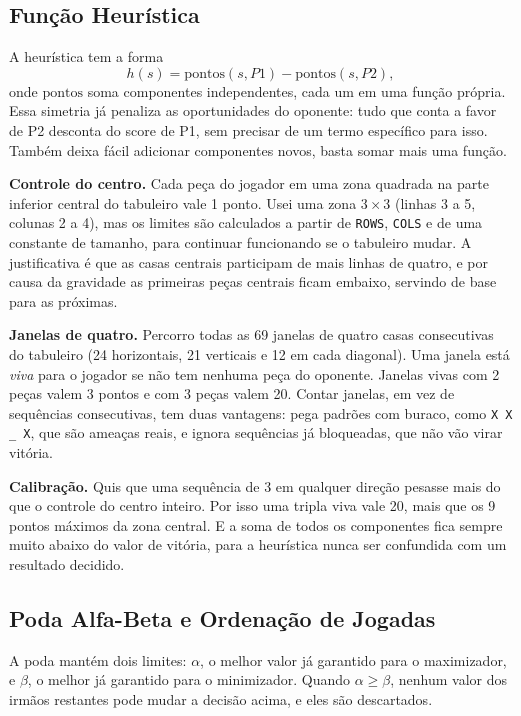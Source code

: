 \documentclass[letterpaper]{article} %
\begin{document}
\subsection{Função Heurística}
A heurística tem a forma
\[
h(s) = \mathrm{pontos}(s, P1) - \mathrm{pontos}(s, P2),
\]
onde $\mathrm{pontos}$ soma componentes independentes, cada um em uma função própria. Essa simetria já penaliza as oportunidades do oponente: tudo que conta a favor de P2 desconta do score de P1, sem precisar de um termo específico para isso. Também deixa fácil adicionar componentes novos, basta somar mais uma função.

\textbf{Controle do centro.} Cada peça do jogador em uma zona quadrada na parte inferior central do tabuleiro vale 1 ponto. Usei uma zona $3 \times 3$ (linhas 3 a 5, colunas 2 a 4), mas os limites são calculados a partir de \texttt{ROWS}, \texttt{COLS} e de uma constante de tamanho, para continuar funcionando se o tabuleiro mudar. A justificativa é que as casas centrais participam de mais linhas de quatro, e por causa da gravidade as primeiras peças centrais ficam embaixo, servindo de base para as próximas.

\textbf{Janelas de quatro.} Percorro todas as 69 janelas de quatro casas consecutivas do tabuleiro (24 horizontais, 21 verticais e 12 em cada diagonal). Uma janela está \emph{viva} para o jogador se não tem nenhuma peça do oponente. Janelas vivas com 2 peças valem 3 pontos e com 3 peças valem 20. Contar janelas, em vez de sequências consecutivas, tem duas vantagens: pega padrões com buraco, como \texttt{X X \_ X}, que são ameaças reais, e ignora sequências já bloqueadas, que não vão virar vitória.

\textbf{Calibração.} Quis que uma sequência de 3 em qualquer direção pesasse mais do que o controle do centro inteiro. Por isso uma tripla viva vale 20, mais que os 9 pontos máximos da zona central. E a soma de todos os componentes fica sempre muito abaixo do valor de vitória, para a heurística nunca ser confundida com um resultado decidido.

\subsection{Poda Alfa-Beta e Ordenação de Jogadas}
A poda mantém dois limites: $\alpha$, o melhor valor já garantido para o maximizador, e $\beta$, o melhor já garantido para o minimizador. Quando $\alpha \ge \beta$, nenhum valor dos irmãos restantes pode mudar a decisão acima, e eles são descartados.
\end{document}
